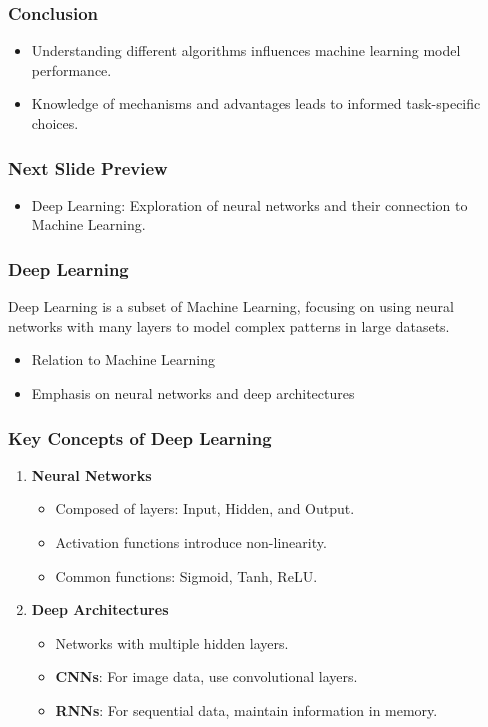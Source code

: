\documentclass{beamer}
\begin{document}
\begin{frame}[fragile]
    \frametitle{Conclusion}
    \begin{itemize}
        \item Understanding different algorithms influences machine learning model performance.
        \item Knowledge of mechanisms and advantages leads to informed task-specific choices.
    \end{itemize}
\end{frame}

\begin{frame}[fragile]
    \frametitle{Next Slide Preview}
    \begin{itemize}
        \item Deep Learning: Exploration of neural networks and their connection to Machine Learning.
    \end{itemize}
\end{frame}

\begin{frame}[fragile]
    \frametitle{Deep Learning}
    Deep Learning is a subset of Machine Learning, focusing on using neural networks with many layers to model complex patterns in large datasets. 
    \begin{itemize}
        \item Relation to Machine Learning
        \item Emphasis on neural networks and deep architectures
    \end{itemize}
\end{frame}

\begin{frame}[fragile]
    \frametitle{Key Concepts of Deep Learning}
    \begin{enumerate}
        \item \textbf{Neural Networks}
            \begin{itemize}
                \item Composed of layers: Input, Hidden, and Output.
                \item Activation functions introduce non-linearity.
                \item Common functions: Sigmoid, Tanh, ReLU.
            \end{itemize}
        \item \textbf{Deep Architectures}
            \begin{itemize}
                \item Networks with multiple hidden layers.
                \item \textbf{CNNs}: For image data, use convolutional layers.
                \item \textbf{RNNs}: For sequential data, maintain information in memory.
            \end{itemize}
    \end{enumerate}
\end{frame}
\end{document}
